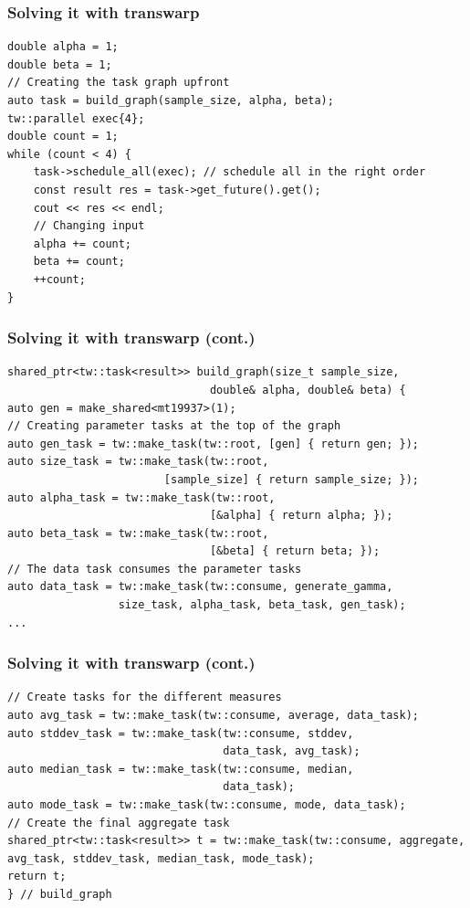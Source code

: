 \documentclass[12pt,aspectratio=169]{beamer}
\begin{document}
\begin{frame}[fragile]
\frametitle{Solving it with transwarp}
\begin{lstlisting}
double alpha = 1;
double beta = 1;
// Creating the task graph upfront
auto task = build_graph(sample_size, alpha, beta);
tw::parallel exec{4};
double count = 1;
while (count < 4) {
    task->schedule_all(exec); // schedule all in the right order
    const result res = task->get_future().get();
    cout << res << endl;
    // Changing input
    alpha += count;
    beta += count;
    ++count;
}
\end{lstlisting}
\end{frame}

\begin{frame}[fragile]
\frametitle{Solving it with transwarp (cont.)}
\begin{lstlisting}
shared_ptr<tw::task<result>> build_graph(size_t sample_size, 
                               double& alpha, double& beta) {
auto gen = make_shared<mt19937>(1);
// Creating parameter tasks at the top of the graph
auto gen_task = tw::make_task(tw::root, [gen] { return gen; });
auto size_task = tw::make_task(tw::root, 
                        [sample_size] { return sample_size; });
auto alpha_task = tw::make_task(tw::root, 
                               [&alpha] { return alpha; });
auto beta_task = tw::make_task(tw::root, 
                               [&beta] { return beta; });
// The data task consumes the parameter tasks
auto data_task = tw::make_task(tw::consume, generate_gamma, 
                 size_task, alpha_task, beta_task, gen_task);
...
\end{lstlisting}
\end{frame}

\begin{frame}[fragile]
\frametitle{Solving it with transwarp (cont.)}
\begin{lstlisting}
// Create tasks for the different measures
auto avg_task = tw::make_task(tw::consume, average, data_task);
auto stddev_task = tw::make_task(tw::consume, stddev, 
                                 data_task, avg_task);
auto median_task = tw::make_task(tw::consume, median, 
                                 data_task);
auto mode_task = tw::make_task(tw::consume, mode, data_task);
// Create the final aggregate task
shared_ptr<tw::task<result>> t = tw::make_task(tw::consume, aggregate, avg_task, stddev_task, median_task, mode_task);
return t;
} // build_graph
\end{lstlisting}
\end{frame}
\end{document}
